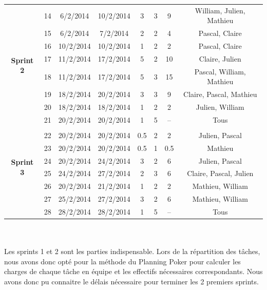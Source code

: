 \documentclass[a4paper,11pt,french]{article}
\begin{document}
\begin{tabular}{|c|c|c|c|c|c|c|c|}
\hline
&&&&&&&\\
\hline
\multirow{8}{*}{\begin{sideways}\textbf{Sprint 2}\end{sideways}}
&14 		& 6/2/2014 		& 10/2/2014 		& 3		& 3 		& 9			& William, Julien, Mathieu\\
\cline{2-8}
&15 		& 6/2/2014 		& 7/2/2014 			& 2 	& 2 		& 4			& Pascal, Claire\\
\cline{2-8}
&16 		& 10/2/2014 	& 10/2/2014 		& 1 	& 2 		& 2			& Pascal, Claire\\
\cline{2-8}
&17 		& 11/2/2014 	& 17/2/2014 		& 5 	& 2 		& 10		& Claire, Julien\\
\cline{2-8}
&18 		& 11/2/2014 	& 17/2/2014 		& 5 	& 3 		& 15		& Pascal, William, Mathieu\\
\cline{2-8}
&19 		& 18/2/2014 	& 20/2/2014 		& 3 	& 3 		& 9			& Claire, Pascal, Mathieu\\
\cline{2-8}
&20 		& 18/2/2014 	& 18/2/2014 		& 1 	& 2 		& 2			& Julien, William\\
\cline{2-8}
&21 		& 20/2/2014 	& 20/2/2014 		& 1 	& 5 		& --		& Tous\\
\hline
&&&&&&&\\
\hline
\multirow{6}{*}{\begin{sideways}\textbf{Sprint 3}\end{sideways}}
&22 		& 20/2/2014 	& 20/2/2014 		& 0.5 	& 2 		& 2			& Julien, Pascal\\
\cline{2-8}
&23 		& 20/2/2014 	& 20/2/2014 		& 0.5 	& 1 		& 0.5 		& Mathieu\\
\cline{2-8}
&24 		& 20/2/2014 	& 24/2/2014 		& 3 	& 2 		& 6			& Julien, Pascal\\
\cline{2-8}
&25 		& 24/2/2014 	& 27/2/2014 		& 2 	& 3 		& 6			& Claire, Pascal, Julien\\
\cline{2-8}
&26 		& 20/2/2014 	& 21/2/2014 		& 1 	& 2 		& 2			& Mathieu, William\\
\cline{2-8}
&27 		& 25/2/2014 	& 27/2/2014 		& 3 	& 2 		& 6			& Mathieu, William\\
\cline{2-8}
&28 		& 28/2/2014 	& 28/2/2014 		& 1 	& 5 		& --			& Tous\\
\hline
\end{tabular}
\\ \\

Les sprints 1 et 2 sont les parties indispensable. Lors de la répartition des tâches, nous avons donc opté pour la méthode du Planning Poker pour calculer les charges de chaque tâche en équipe et les effectifs nécessaires correspondants. Nous avons donc pu connaitre le délais nécessaire pour terminer les 2 premiers sprints.
\\
\end{document}
